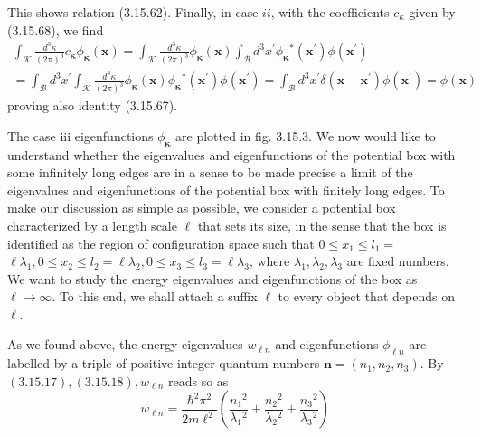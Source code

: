 \documentclass{article}
\begin{document}
This shows relation (3.15.62). Finally, in case $i i$, with the coefficients $c_{\kappa}$ given by (3.15.68), we find
$$
\begin{align*}
\int_{\mathcal{K}} \frac{d^{3} \kappa}{(2 \pi)^{3}} c_{\boldsymbol{\kappa}} \phi_{\boldsymbol{\kappa}}(\boldsymbol{x})=\int_{\mathcal{K}} \frac{d^{3} \kappa}{(2 \pi)^{3}} \phi_{\boldsymbol{\kappa}}(\boldsymbol{x}) \int_{\mathcal{B}} d^{3} x^{\prime} \phi_{\boldsymbol{\kappa}}{ }^{*}\left(\boldsymbol{x}^{\prime}\right) \phi\left(\boldsymbol{x}^{\prime}\right)  \tag{3.15.85}\\
=\int_{\mathcal{B}} d^{3} x^{\prime} \int_{\mathcal{K}} \frac{d^{3} \kappa}{(2 \pi)^{3}} \phi_{\boldsymbol{\kappa}}(\boldsymbol{x}) \phi_{\boldsymbol{\kappa}}{ }^{*}\left(\boldsymbol{x}^{\prime}\right) \phi\left(\boldsymbol{x}^{\prime}\right)=\int_{\mathcal{B}} d^{3} x^{\prime} \delta\left(\boldsymbol{x}-\boldsymbol{x}^{\prime}\right) \phi\left(\boldsymbol{x}^{\prime}\right)=\phi(\boldsymbol{x})
\end{align*}
$$
proving also identity (3.15.67).

The case iii eigenfunctions $\phi_{\boldsymbol{\kappa}}$ are plotted in fig. 3.15.3.
We now would like to understand whether the eigenvalues and eigenfunctions of the potential box with some infinitely long edges are in a sense to be made precise a limit of the eigenvalues and eigenfunctions of the potential box with finitely long edges. To make our discussion as simple as possible, we consider a potential box characterized by a length scale $\ell$ that sets its size, in the sense that the box is identified as the region of configuration space such that $0 \leq x_{1} \leq l_{1}=$ $\ell \lambda_{1}, 0 \leq x_{2} \leq l_{2}=\ell \lambda_{2}, 0 \leq x_{3} \leq l_{3}=\ell \lambda_{3}$, where $\lambda_{1}, \lambda_{2}, \lambda_{3}$ are fixed numbers. We want to study the energy eigenvalues and eigenfunctions of the box as $\ell \rightarrow \infty$. To this end, we shall attach a suffix $\ell$ to every object that depends on $\ell$.

As we found above, the energy eigenvalues $w_{\ell n}$ and eigenfunctions $\phi_{\ell n}$ are labelled by a triple of positive integer quantum numbers $\boldsymbol{n}=\left(n_{1}, n_{2}, n_{3}\right)$. By $(3.15 .17),(3.15 .18), w_{\ell n}$ reads so as
$$
\begin{equation*}
w_{\ell n}=\frac{\hbar^{2} \pi^{2}}{2 m \ell^{2}}\left(\frac{n_{1}{ }^{2}}{\lambda_{1}{ }^{2}}+\frac{n_{2}{ }^{2}}{\lambda_{2}{ }^{2}}+\frac{n_{3}{ }^{2}}{\lambda_{3}{ }^{2}}\right) \tag{3.15.86}
\end{equation*}
$$
\end{document}
